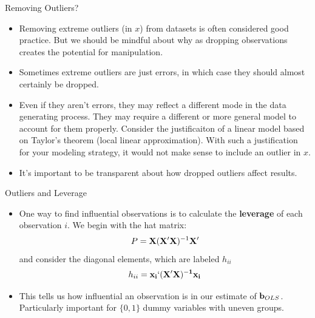 \documentclass[aspectratio=169,11pt]{beamer}
\begin{document}
\begin{frame}{Removing Outliers?}
\begin{itemize}
\item Removing extreme outliers (in $x$) from datasets is often considered good practice. But we should be mindful
		about why as dropping observations creates the potential for manipulation. 

	\medskip
	\item Sometimes extreme outliers are just errors, in which case they should almost certainly be dropped.

	\medskip
	\item Even if they aren't errors, they may reflect a different mode in the data generating process. They may require
		a different or more general model to account for them properly. Consider the justificaiton of a linear
		model based on Taylor's theorem (local linear approximation). With such a justification for your modeling
		strategy, it would not make sense to include an outlier in $x$.
	\medskip
	\item It's important to be transparent about how dropped outliers affect results. 

\end{itemize}
\end{frame}




\begin{frame}{Outliers and Leverage}
\begin{itemize}
\item One way to find influential observations is to calculate the {\bf leverage} of each observation $i$. We begin with the hat matrix:
\begin{align*}
P = {\bf X} ({\bf X} '{\bf X})^{-1}  {\bf X}'
\end{align*}
and consider the diagonal elements, which are labeled $h_{ii}$
\begin{align*}
h_{ii} = \bf{x}_i `({\bf X} '{\bf X})^{-1}  \bf{x}_i
\end{align*}

\medskip
\item This tells us how influential an observation is in our estimate of ${\bf b}_{OLS}$.\\
Particularly important for $\{0,1\}$ dummy variables with uneven groups.
\end{itemize}
\end{frame}
\end{document}
